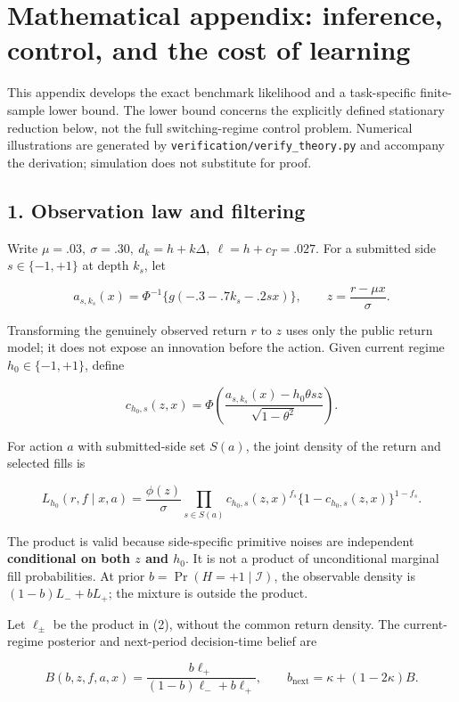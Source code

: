 \documentclass[
  10pt,
  a4paper,
]{article}
\author{}
\date{}
\begin{document}
\section{Mathematical appendix: inference, control, and the cost of
learning}\label{mathematical-appendix-inference-control-and-the-cost-of-learning}

This appendix develops the exact benchmark likelihood and a
task-specific finite-sample lower bound. The lower bound concerns the
explicitly defined stationary reduction below, not the full
switching-regime control problem. Numerical illustrations are generated
by \texttt{verification/verify\_theory.py} and accompany the derivation;
simulation does not substitute for proof.

\subsection{1. Observation law and
filtering}\label{observation-law-and-filtering}

Write \(\mu=.03,\ \sigma=.30,\ d_k=h+k\Delta,\ \ell=h+c_T=.027\). For a
submitted side \(s\in\{-1,+1\}\) at depth \(k_s\), let

\[
a_{s,k_s}(x)=\Phi^{-1}\{g(-.3-.7k_s-.2sx)\},\qquad
z=\frac{r-\mu x}{\sigma}.
\]

Transforming the genuinely observed return \(r\) to \(z\) uses only the
public return model; it does not expose an innovation before the action.
Given current regime \(h_0\in\{-1,+1\}\), define

\[
c_{h_0,s}(z,x)=
\Phi\!\left(\frac{a_{s,k_s}(x)-h_0\theta sz}{\sqrt{1-\theta^2}}\right).
\tag{1}
\]

For action \(a\) with submitted-side set \(S(a)\), the joint density of
the return and selected fills is

\[
L_{h_0}(r,f\mid x,a)=
\frac{\phi(z)}{\sigma}
\prod_{s\in S(a)}
c_{h_0,s}(z,x)^{f_s}\{1-c_{h_0,s}(z,x)\}^{1-f_s}.
\tag{2}
\]

The product is valid because side-specific primitive noises are
independent \textbf{conditional on both \(z\) and \(h_0\)}. It is not a
product of unconditional marginal fill probabilities. At prior
\(b=\Pr(H=+1\mid\mathcal I)\), the observable density is
\((1-b)L_-+bL_+\); the mixture is outside the product.

Let \(\ell_\pm\) be the product in (2), without the common return
density. The current-regime posterior and next-period decision-time
belief are

\[
B(b,z,f,a,x)=\frac{b\ell_+}{(1-b)\ell_-+b\ell_+},
\qquad
b_{\mathrm{next}}=\kappa+(1-2\kappa)B.
\tag{3}
\]
\end{document}
